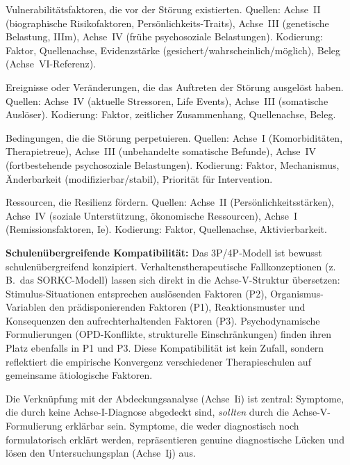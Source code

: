 \documentclass[11pt,a4paper]{article}
\begin{document}
\begin{description}[style=nextline, leftmargin=1.5cm, font=\bfseries]
\item[Pr\"adisponierende Faktoren (P1)] Vulnerabilit\"atsfaktoren, die vor der St\"orung existierten. Quellen: Achse~II (biographische Risikofaktoren, Pers\"onlichkeits-Traits), Achse~III (genetische Belastung, IIIm), Achse~IV (fr\"uhe psychosoziale Belastungen). Kodierung: Faktor, Quellenachse, Evidenzst\"arke (gesichert/wahrscheinlich/m\"oglich), Beleg (Achse~VI-Referenz).
\item[Ausl\"osende Faktoren (P2)] Ereignisse oder Ver\"anderungen, die das Auftreten der St\"orung ausgel\"ost haben. Quellen: Achse~IV (aktuelle Stressoren, Life Events), Achse~III (somatische Ausl\"oser). Kodierung: Faktor, zeitlicher Zusammenhang, Quellenachse, Beleg.
\item[Aufrechterhaltende Faktoren (P3)] Bedingungen, die die St\"orung perpetuieren. Quellen: Achse~I (Komorbidit\"aten, Therapietreue), Achse~III (unbehandelte somatische Befunde), Achse~IV (fortbestehende psychosoziale Belastungen). Kodierung: Faktor, Mechanismus, \"Anderbarkeit (modifizierbar/stabil), Priorit\"at f\"ur Intervention.
\item[Protektive Faktoren (P4)] Ressourcen, die Resilienz f\"ordern. Quellen: Achse~II (Pers\"onlichkeitsst\"arken), Achse~IV (soziale Unterst\"utzung, \"okonomische Ressourcen), Achse~I (Remissionsfaktoren, Ie). Kodierung: Faktor, Quellenachse, Aktivierbarkeit.
\end{description}

\textbf{Schulen\"ubergreifende Kompatibilit\"at:} Das 3P/4P-Modell ist bewusst schulen\"ubergreifend konzipiert. Verhaltenstherapeutische Fallkonzeptionen (z.\,B.\ das SORKC-Modell) lassen sich direkt in die Achse-V-Struktur \"ubersetzen: Stimulus-Situationen entsprechen ausl\"osenden Faktoren (P2), Organismus-Variablen den pr\"adisponierenden Faktoren (P1), Reaktionsmuster und Konsequenzen den aufrechterhaltenden Faktoren (P3). Psychodynamische Formulierungen (OPD-Konflikte, strukturelle Einschr\"ankungen) finden ihren Platz ebenfalls in P1 und P3. Diese Kompatibilit\"at ist kein Zufall, sondern reflektiert die empirische Konvergenz verschiedener Therapieschulen auf gemeinsame \"atiologische Faktoren.

Die Verkn\"upfung mit der Abdeckungsanalyse (Achse~Ii) ist zentral: Symptome, die durch keine Achse-I-Diagnose abgedeckt sind, \textit{sollten} durch die Achse-V-Formulierung erkl\"arbar sein. Symptome, die weder diagnostisch noch formulatorisch erkl\"art werden, repr\"asentieren genuine diagnostische L\"ucken und l\"osen den Untersuchungsplan (Achse~Ij) aus.
\end{document}
